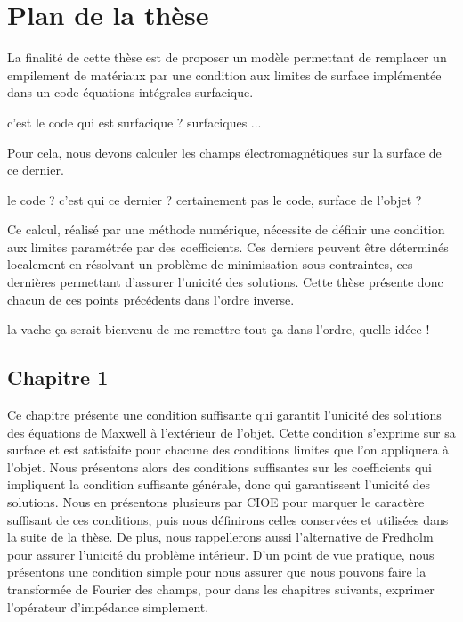 \section*{Plan de la thèse}

La finalité de cette thèse est de proposer un modèle permettant de remplacer un empilement de matériaux par une condition aux limites
de surface implémentée dans un code équations intégrales surfacique.
\begin{REM}
	c'est le code qui est surfacique ? surfaciques ...
\end{REM}
Pour cela, nous devons calculer les champs électromagnétiques sur la surface de ce dernier.
\begin{REM}
	le code ? c'est qui ce dernier ? certainement pas le code, surface de l'objet ?
\end{REM}
Ce calcul, réalisé par une méthode numérique, nécessite de définir une condition aux limites paramétrée par des coefficients.
Ces derniers peuvent être déterminés localement en résolvant un problème de minimisation sous contraintes, ces dernières permettant d'assurer l'unicité des solutions.
Cette thèse présente donc chacun de ces points précédents dans l'ordre inverse.
\begin{REM}
	la vache ça serait bienvenu de me remettre tout ça dans l'ordre, quelle idéee !
\end{REM}

\subsection*{Chapitre 1}
Ce chapitre présente une condition suffisante qui garantit l'unicité des solutions des équations de Maxwell à l'extérieur de l'objet.
Cette condition s'exprime sur sa surface et est satisfaite pour chacune des conditions limites que l'on appliquera à l'objet. 
Nous présentons alors des conditions suffisantes sur les coefficients qui impliquent la condition suffisante générale, donc qui garantissent l'unicité des solutions.
Nous en présentons plusieurs par CIOE pour marquer le caractère suffisant de ces conditions, puis nous définirons celles conservées et utilisées dans la suite de la thèse.
De plus, nous rappellerons aussi l'alternative de Fredholm pour assurer l'unicité du problème intérieur. D'un point de vue pratique, nous présentons une condition simple pour nous assurer que nous pouvons faire la transformée de Fourier des champs, pour dans les chapitres suivants, exprimer l'opérateur d'impédance simplement.

